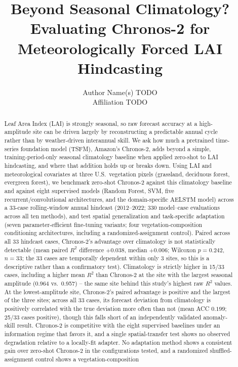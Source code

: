 \documentclass[11pt]{article}
\title{Beyond Seasonal Climatology? Evaluating Chronos-2 for\\
Meteorologically Forced LAI Hindcasting}
\author{Author Name(s) TODO \\ \small Affiliation TODO}
\date{}
\begin{document}
\maketitle

\begin{abstract}
Leaf Area Index (LAI) is strongly seasonal, so raw forecast accuracy at a high-amplitude site can
be driven largely by reconstructing a predictable annual cycle rather than by weather-driven
interannual skill. We ask how much a pretrained time-series foundation model (TSFM), Amazon's
Chronos-2, adds beyond a simple, training-period-only seasonal climatology baseline when applied
zero-shot to LAI hindcasting, and where that addition holds up or breaks down. Using LAI and
meteorological covariates at three U.S.\ vegetation pixels (grassland, deciduous forest, evergreen
forest), we benchmark zero-shot Chronos-2 against this climatology baseline and against eight
supervised models (Random Forest, SVM, five recurrent/convolutional architectures, and the
domain-specific AELSTM model) across a 33-case rolling-window annual hindcast (2012--2022; 330
model--case evaluations across all ten methods), and test spatial generalization and task-specific
adaptation (seven parameter-efficient fine-tuning variants; four vegetation-composition
conditioning architectures, including a randomized-assignment control). Paired across all 33
hindcast cases, Chronos-2's advantage over climatology is not statistically detectable (mean
paired $R^2$ difference $+0.038$, median $+0.006$; Wilcoxon $p=0.242$, $n=33$; the 33 cases are
temporally dependent within only 3 sites, so this is a descriptive rather than a confirmatory
test). Climatology is strictly higher in 15/33 cases, including a higher mean $R^2$ than Chronos-2
at the site with the largest seasonal amplitude (0.964 vs.\ 0.957) -- the same site behind this
study's highest raw $R^2$ values. At the lowest-amplitude site, Chronos-2's paired advantage is
positive and the largest of the three sites; across all 33 cases, its forecast deviation from
climatology is positively correlated with the true deviation more often than not (mean ACC
$0.199$; 25/33 cases positive), though this falls short of an independently validated anomaly-skill
result. Chronos-2 is competitive with the eight supervised baselines under an information regime
that favors it, and a single spatial-transfer test shows no observed degradation relative to a
locally-fit adapter. No adaptation method shows a consistent gain over zero-shot Chronos-2 in the
configurations tested, and a randomized shuffled-assignment control shows a vegetation-composition

\end{abstract}
\end{document}

